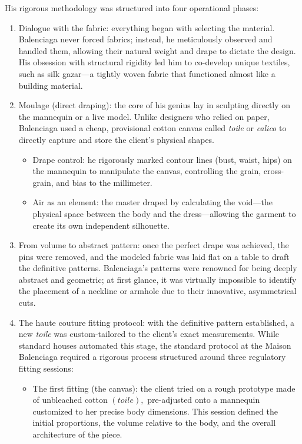 \documentclass[11pt, a4paper]{article}
\begin{document}
His rigorous methodology was structured into four operational phases:

\begin{enumerate}
\item {Dialogue with the fabric:} everything began with selecting the material. Balenciaga never forced fabrics; instead, he meticulously observed and handled them, allowing their natural weight and drape to dictate the design. His obsession with structural rigidity led him to co-develop unique textiles, such as silk gazar---a tightly woven fabric that functioned almost like a building material.

 \item {Moulage (direct draping):} the core of his genius lay in sculpting directly on the mannequin or a live model. Unlike designers who relied on paper, Balenciaga used a cheap, provisional cotton canvas called \textit{toile} or \textit{calico} to directly capture and store the client's physical shapes.
\begin{itemize}
\item {Drape control:} he rigorously marked contour lines (bust, waist, hips) on the mannequin to manipulate the canvas, controlling the grain, cross-grain, and bias to the millimeter.
\item {Air as an element:} the master draped by calculating the void---the physical space between the body and the dress---allowing the garment to create its own independent silhouette.
\end{itemize}
\item {From volume to abstract pattern:} once the perfect drape was achieved, the pins were removed, and the modeled fabric was laid flat on a table to draft the definitive patterns. Balenciaga's patterns were renowned for being deeply abstract and geometric; at first glance, it was virtually impossible to identify the placement of a neckline or armhole due to their innovative, asymmetrical cuts.

\item {The haute couture fitting protocol:} with the definitive pattern established, a new \textit{toile} was custom-tailored to the client's exact measurements. While standard houses automated this stage, the standard protocol at the Maison Balenciaga required a rigorous process structured around three regulatory fitting sessions:
\begin{itemize}

\item {The first fitting (the canvas):} the client tried on a rough prototype made of unbleached cotton \((\textit{toile}),\) pre-adjusted onto a mannequin customized to her precise body dimensions. This session defined the initial proportions, the volume relative to the body, and the overall architecture of the piece.


\end{itemize}
\end{enumerate}
\end{document}

